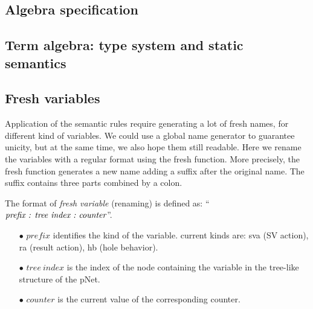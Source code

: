 \documentclass{lncs/llncs}
\begin{document}



\subsection{Algebra specification}
\subsection{Term algebra: type system and static semantics}
\subsection{Fresh variables}


Application of the semantic rules require generating a lot of fresh
names, for different kind of variables. We could use a global name
generator to guarantee unicity, but 
at the same time, we also hope them still
readable. Here we rename the variables with a regular format using the fresh function.
More precisely, the fresh function generates a new name adding a
suffix after the original name. The suffix contains three parts
combined by a colon.  


\begin{definition}\label{fresh-variable}
The format of \emph{fresh variable} (renaming) is defined as:
``$\emph{prefix : tree\ index\ :\ counter}$''.
\begin{itemize}
   \item[$\bullet$] $prefix$ identifies the kind of the
     variable. current kinds are: sva (SV action), ra (result action), hb (hole behavior).
   \item[$\bullet$] $tree\ index$ is the index of the node containing the variable in the tree-like structure of the pNet.
   \item[$\bullet$] $counter$ is the current value of the corresponding counter.
\end{itemize}
\end{definition}
\end{document}
